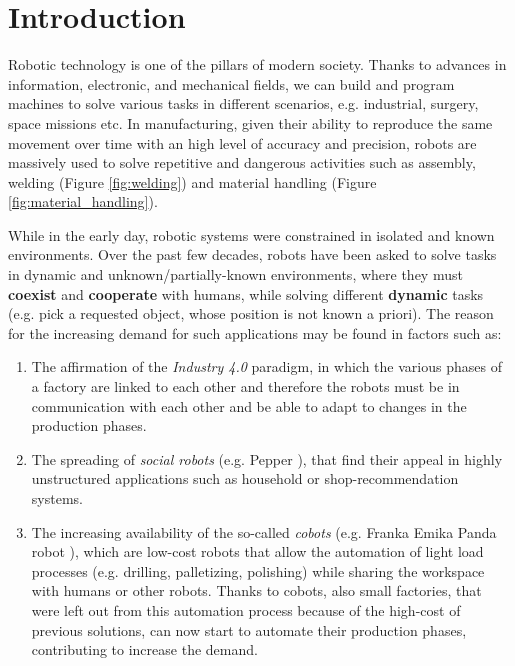 \section{Introduction}
\label{sec:intro}
Robotic technology is one of the pillars of modern society. Thanks to advances in information, electronic, and
mechanical fields, we can build and program machines to solve various tasks in different scenarios, e.g. industrial,
surgery, space missions etc. \newline In manufacturing, given their ability to reproduce the same movement over time
with an high level of accuracy and precision, robots are massively used to solve repetitive and dangerous activities
such as assembly, welding (Figure \ref{fig:welding}) and material handling    (Figure \ref{fig:material_handling}).

\noindent While in the early day, robotic systems were constrained in isolated and known environments. Over the past few
decades, robots have been asked to solve tasks in dynamic and unknown/partially-known environments, where they must
\textbf{coexist} and \textbf{cooperate} with humans, while  solving different \textbf{dynamic} tasks (e.g. pick a
requested object, whose position is not known a priori). \newline The reason for the increasing demand for such
applications may be found in factors such as:
\begin{enumerate}[label=(\alph*)]
    \item The affirmation of the \textit{Industry 4.0} paradigm, in which the various phases of a factory are linked to
    each other and therefore the robots must be in communication with each other and be able to adapt to changes in the
    production phases.
    \item The spreading of \textit{social robots} (e.g. Pepper \cite{pepper}), that find their appeal in highly
    unstructured applications such as household or shop-recommendation systems.      
    \item The increasing availability of the so-called \textit{cobots} (e.g. Franka Emika Panda robot \cite{panda}),
    which are low-cost robots that allow the automation of light load processes (e.g. drilling, palletizing, polishing)
    while sharing the workspace with humans or other robots. Thanks to cobots, also small factories, that were left out
    from this automation process because of the high-cost of previous solutions, can now start to automate their
    production phases, contributing to increase the demand.
\end{enumerate}
